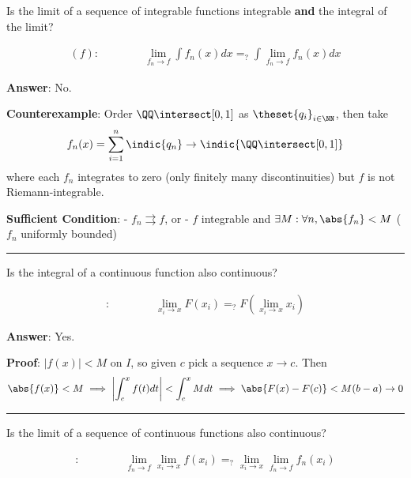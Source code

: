Is the limit of a sequence of integrable functions integrable
\textbf{and} the integral of the limit?

\begin{align*}
[\int dx, \lim_{f_n \to f}](f):\qquad\qquad
\lim_{f_n \to f}\int f_n(x) dx =_? \int \lim_{f_n \to f} f_n(x) dx
\end{align*}

\textbf{Answer}: No.

\textbf{Counterexample}: Order \(\QQ\intersect[0,1]\) as
\(\theset{q_i}_{i\in\NN}\), then take
\begin{align*}
f_n(x) = \sum_{i=1}^n \indic{q_n} \to \indic{{\QQ\intersect[0,1]}}
\end{align*} where each \(f_n\) integrates to zero (only finitely many
discontinuities) but \(f\) is not Riemann-integrable.

\textbf{Sufficient Condition}: - \(f_n \rightrightarrows f\), or - \(f\)
integrable and \(\exists M: \forall n, \abs{f_n} < M\) (\(f_n\)
uniformly bounded)

\begin{center}\rule{0.5\linewidth}{0.5pt}\end{center}

Is the integral of a continuous function also continuous?

\begin{align*}
[\int dx, \lim_{x_i \to x}]:\qquad\qquad
\lim_{x_i \to x} F(x_i) =_? F(\lim_{x_i \to x} x_i)
\end{align*}

\textbf{Answer}: Yes.

\textbf{Proof}: \(|f(x)| < M\) on \(I\), so given \(c\) pick a sequence
\(x\to c\). Then
\begin{align*}
\abs{f(x)} < M \implies \left\vert \int_c^x f(t)dt \right\vert < \int_c^x M dt \implies \abs{F(x) - F(c)} < M(b-a) \to 0
\end{align*}

\begin{center}\rule{0.5\linewidth}{0.5pt}\end{center}

Is the limit of a sequence of continuous functions also continuous?

\begin{align*}
[\lim_{x_i \to x}, \lim_{f_n \to f}]: \qquad\qquad
\lim_{f_n \to f}\lim_{x_i \to x} f(x_i) =_? \lim_{x_i \to x}\lim_{f_n \to f} f_n(x_i)\\
\text{}\\
\end{align*}

